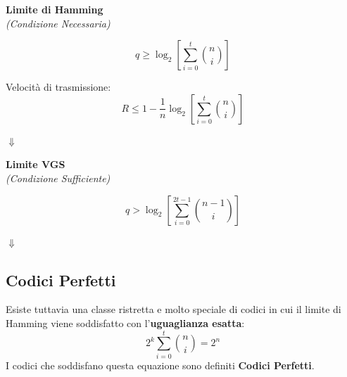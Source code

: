 \vspace{0.5cm}
\noindent
\begin{minipage}[t]{0.48\textwidth}
    \centering
    \textbf{Limite di Hamming}\\
    \textit{(Condizione Necessaria)}
    
    \[ q \ge \log_2 \left[ \sum_{i=0}^t\binom{n}{i} \right] \]
    
    Velocità di trasmissione:
    \[ R \le 1 - \frac{1}{n}\log_2 \left[ \sum_{i=0}^t\binom{n}{i} \right] \]
    
    \vspace{0.4cm}
    $\Downarrow$
    \vspace{0.2cm}
    
\end{minipage}
\hfill
\begin{minipage}[t]{0.48\textwidth}
    \centering
    \textbf{Limite VGS}\\
    \textit{(Condizione Sufficiente)}
    
    \[ q > \log_2 \left[ \sum_{i=0}^{2t-1}\binom{n-1}{i} \right] \]
    
    \vspace{1.75cm} %
    $\Downarrow$
    \vspace{0.2cm}
    
\end{minipage}
\vspace{0.5cm}

\subsection{Codici Perfetti}
Esiste tuttavia una classe ristretta e molto speciale di codici in cui il limite di Hamming viene soddisfatto con l'\textbf{uguaglianza esatta}:
\[ 2^k \sum_{i=0}^t \binom{n}{i} = 2^n \]
I codici che soddisfano questa equazione sono definiti \textbf{Codici Perfetti}.


